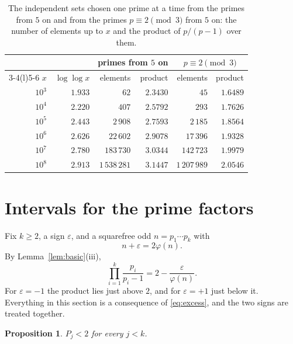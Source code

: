 \documentclass[11pt,reqno]{amsart}
\numberwithin{equation}{section}
\theoremstyle{plain}
\newtheorem{proposition}[theorem]{Proposition}
\theoremstyle{definition}
\theoremstyle{remark}
\begin{document}
\begin{table}[ht]
\centering
\caption{The independent sets chosen one prime at a time from the
primes from $5$ on and from the primes $p\equiv2\pmod3$ from $5$ on:
the number of elements up to $x$ and the product of $p/(p-1)$ over
them.}
\label{tab:greedy}
\smallskip
\small
\begin{tabular}{@{}rrrrrr@{}}
\toprule
 & & \multicolumn{2}{c}{primes from $5$ on} &
 \multicolumn{2}{c}{$p\equiv2\pmod3$} \\
\cmidrule(lr){3-4}\cmidrule(l){5-6}
$x$ & $\log\log x$ & elements & product & elements & product \\
\midrule
$10^3$ & $1.933$ & $62$ & $2.3430$ & $45$ & $1.6489$ \\
$10^4$ & $2.220$ & $407$ & $2.5792$ & $293$ & $1.7626$ \\
$10^5$ & $2.443$ & $2\,908$ & $2.7593$ & $2\,185$ & $1.8564$ \\
$10^6$ & $2.626$ & $22\,602$ & $2.9078$ & $17\,396$ & $1.9328$ \\
$10^7$ & $2.780$ & $183\,730$ & $3.0344$ & $142\,723$ & $1.9979$ \\
$10^8$ & $2.913$ & $1\,538\,281$ & $3.1447$ & $1\,207\,989$ & $2.0546$ \\
\bottomrule
\end{tabular}
\end{table}

\section{Intervals for the prime factors}\label{sec:search}

Fix $k\ge2$, a sign $\varepsilon$, and a squarefree odd
$n=p_1\cdots p_k$ with
\begin{equation}\label{eq:M2}
  n+\varepsilon=2\varphi(n).
\end{equation}
By Lemma~\ref{lem:basic}(iii),
\begin{equation}\label{eq:excess}
  \prod_{i=1}^{k}\frac{p_i}{p_i-1}=2-\frac{\varepsilon}{\varphi(n)} .
\end{equation}
For $\varepsilon=-1$ the product lies just above $2$, and for
$\varepsilon=+1$ just below it. Everything in this section is a
consequence of \eqref{eq:excess}, and the two signs are treated
together.

\begin{proposition}\label{prop:below2}
$P_j<2$ for every $j<k$.
\end{proposition}
\end{document}
